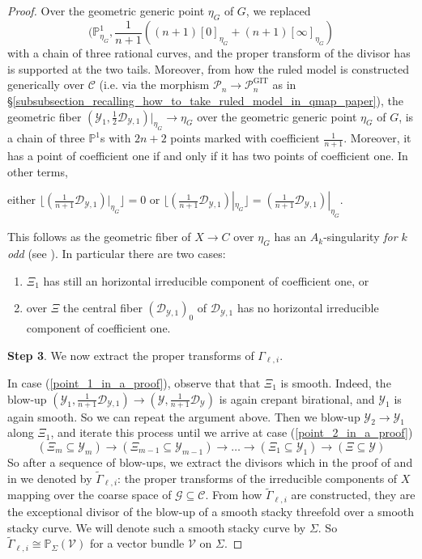\documentclass[a4paper,12pt]{amsart}
\DeclareMathOperator{\GIT}{GIT}
\newcommand{\bP}{{\mathbb P}}
\newcommand{\sY}{{\mathscr{Y}}}
\newcommand{\sP}{{\mathscr{P}}}
\newcommand{\sD}{{\mathscr{D}}}
\newcommand{\sC}{{\mathscr{C}}}
\newcommand{\cG}{{\mathcal{G}}}
\newcommand{\cV}{{\mathcal{V}}}
\theoremstyle{definition}
\theoremstyle{remark}
\begin{document}
\begin{proof}
    Over the geometric generic point $\eta_G$ of $G$, we replaced \[\textstyle (\bP^1_{\eta_G},\frac{1}{n+1}((n+1)[0]_{\eta_G}+(n+1)[\infty]_{\eta_G})\] with a chain of three rational curves, and the proper
    transform of the divisor has is supported at the two tails.
    Moreover, from how the ruled model is constructed generically over $\sC$ (i.e. via the morphism $\sP_n\to \sP_n^{\GIT}$ as in \S \ref{subsubsection_recalling_how_to_take_ruled_model_in_qmap_paper}), the geometric fiber $(\sY_1,\frac{1}{2}\sD_{\sY,1})|_{\eta_G}\to \eta_G$ over the geometric generic point $\eta_G$ of $G$, is a chain of three $\bP^1$s with $2n+2$ points marked with coefficient $\frac{1}{n+1}$. Moreover, it has a point of coefficient one if and only if it has two points of coefficient one.
In other terms, 
\begin{center}either  $ \lfloor (\frac{1}{n+1}\sD_{\sY,1})|_{\eta_G} \rfloor =0$ or $\lfloor (\frac{1}{n+1}\sD_{\sY,1})|_{\eta_G} \rfloor  =   (\frac{1}{n+1}\sD_{\sY,1})|_{\eta_G}$.\end{center}  
    This follows as the geometric fiber of $X\to C$ over $\eta_G$ has an $A_{k}$-singularity \textit{for $k$ odd} (see ).
    In particular there are two cases:
    \begin{enumerate}
        \item\label{point_1_in_a_proof} $\Xi_1$ has still an horizontal irreducible component of coefficient one, or
        \item\label{point_2_in_a_proof} over $\Xi$ the central fiber $(\sD_{\sY,1})_0$ of $\sD_{\sY,1}$ has no horizontal irreducible component of coefficient one.
    \end{enumerate}

\textbf{Step 3}. We now extract the proper transforms of $\Gamma_{\ell,i}$.

In case (\ref{point_1_in_a_proof}), observe that that $\Xi_1$ is smooth. Indeed, the blow-up $(\sY_1,\frac{1}{n+1}\sD_{\sY,1})\to (\sY,\frac{1}{n+1}\sD_\sY)$ is again crepant birational, and $\sY_1$ is again smooth. So we can repeat the argument above. Then we blow-up $\sY_2\to \sY_1$ along $\Xi_1$, and iterate this process until we arrive at case (\ref{point_2_in_a_proof})
\[
(\Xi_m\subseteq \sY_m)\to (\Xi_{m-1}\subseteq \sY_{m-1})\to \ldots \to (\Xi_1\subseteq \sY_1)\to (\Xi\subseteq \sY)
\]
So after a sequence of blow-ups, we extract the divisors which in the proof of  and in  we denoted by $\widetilde{\Gamma}_{\ell,i}$: the proper transforms of the irreducible components of $X$ mapping over the coarse space of $\cG\subseteq \sC$. From how $\widetilde{\Gamma}_{\ell,i}$ are constructed, they are the exceptional divisor of the blow-up of a
smooth stacky threefold over a smooth stacky curve. We will denote such a smooth stacky curve by $\Sigma$. So $\widetilde{\Gamma}_{\ell,i}\cong \bP_\Sigma(\cV)$ for a vector bundle $\cV$ on $\Sigma.$


\end{proof}
\end{document}
